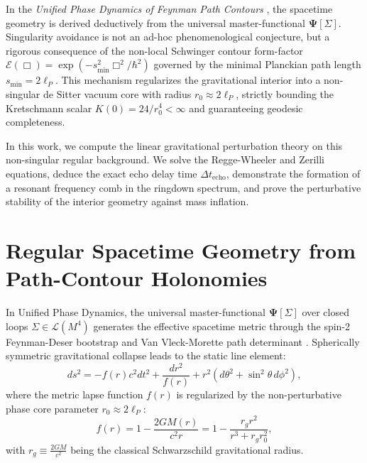 \documentclass[11pt,a4paper]{article}
\begin{document}
In the \textit{Unified Phase Dynamics of Feynman Path Contours} \cite{Pavliuk2026a,Pavliuk2026b}, the spacetime geometry is derived deductively from the universal master-functional $\mathbf{\Psi}[\Sigma]$. Singularity avoidance is not an ad-hoc phenomenological conjecture, but a rigorous consequence of the non-local Schwinger contour form-factor $\mathcal{E}(\Box) = \exp(-s_{\min}^2 \Box^2/\hbar^2)$ governed by the minimal Planckian path length $s_{\min} = 2\ell_P$. This mechanism regularizes the gravitational interior into a non-singular de Sitter vacuum core with radius $r_0 \approx 2\ell_P$, strictly bounding the Kretschmann scalar $K(0) = 24/r_0^4 < \infty$ and guaranteeing geodesic completeness.

In this work, we compute the linear gravitational perturbation theory on this non-singular regular background. We solve the Regge-Wheeler and Zerilli equations, deduce the exact echo delay time $\Delta t_{\mathrm{echo}}$, demonstrate the formation of a resonant frequency comb in the ringdown spectrum, and prove the perturbative stability of the interior geometry against mass inflation.

\section{Regular Spacetime Geometry from Path-Contour Holonomies}

In Unified Phase Dynamics, the universal master-functional $\mathbf{\Psi}[\Sigma]$ over closed loops $\Sigma \in \mathcal{L}(M^4)$ generates the effective spacetime metric through the spin-2 Feynman-Deser bootstrap and Van Vleck-Morette path determinant \cite{Pavliuk2026a}. Spherically symmetric gravitational collapse leads to the static line element:
\begin{equation}
ds^2 = - f(r) c^2 dt^2 + \frac{dr^2}{f(r)} + r^2 (d\theta^2 + \sin^2\theta\, d\phi^2),
\label{eq:metric}
\end{equation}
where the metric lapse function $f(r)$ is regularized by the non-perturbative phase core parameter $r_0 \approx 2\ell_P$:
\begin{equation}
f(r) = 1 - \frac{2 G M(r)}{c^2 r} = 1 - \frac{r_g r^2}{r^3 + r_g r_0^2},
\label{eq:lapse}
\end{equation}
with $r_g \equiv \frac{2GM}{c^2}$ being the classical Schwarzschild gravitational radius.
\end{document}
